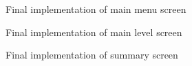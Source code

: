 \documentclass{l4proj}
\begin{document}
\begin{appendices}
\begin{figure}[H]
    \caption{Final implementation of main menu screen}
    \label{fig:menu_final}
\end{figure}

\begin{figure}[H]
    \caption{Final implementation of main level screen}
    \label{fig:email_final}
\end{figure}

\begin{figure}[H]
    \caption{Final implementation of summary screen}
    \label{fig:summary_final}
\end{figure}


\end{appendices}
\end{document}
